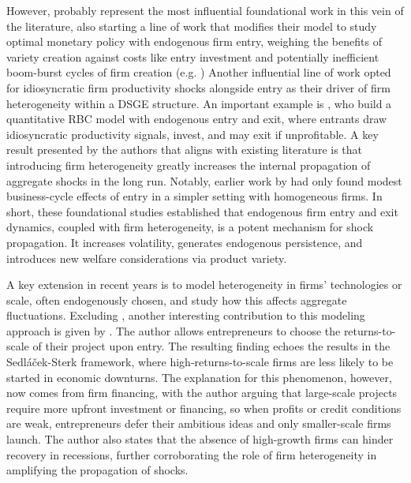 \documentclass[a4paper,12pt]{article} %
\numberwithin{equation}{section} %
\numberwithin{figure}{section}
\numberwithin{table}{section}
\begin{document}
However, \textcite{bilbiie2012endogenous} probably represent the most influential foundational work in this vein of the literature, 
also starting a line of work that modifies their model to study optimal monetary policy with endogenous firm entry, weighing the benefits 
of variety creation against costs like entry investment and potentially inefficient boom-burst cycles of firm creation (e.g. \cite{bilbiie2014optimal, lewis2012firm})
Another influential line of work opted for idiosyncratic firm productivity shocks alongside entry as their driver of firm heterogeneity within a DSGE structure. 
An important example is \textcite{clementi2016entry}, who build a quantitative RBC model with endogenous entry and exit, where entrants draw idiosyncratic 
productivity signals, invest, and may exit if unprofitable. A key result presented by the authors that aligns with existing literature is that introducing 
firm heterogeneity greatly increases the internal propagation of aggregate shocks in the long run. Notably, earlier work by \textcite{samaniego2008entry} had 
only found modest business-cycle effects of entry in a simpler setting with homogeneous firms. In short, these foundational studies established that 
endogenous firm entry and exit dynamics, coupled with firm heterogeneity, is a potent mechanism for shock propagation. It increases volatility, 
generates endogenous persistence, and introduces new welfare considerations via product variety.

A key extension in recent years is to model heterogeneity in firms' technologies or scale, often endogenously chosen, and study how this 
affects aggregate fluctuations. Excluding \textcite{sedlavcek2017growth}, another interesting contribution to this modeling approach is given 
by \textcite{smirnyagin2023returns}. The author allows entrepreneurs to choose the returns-to-scale of their project upon entry. The resulting 
finding echoes the results in the Sedláček-Sterk framework, where high-returns-to-scale firms are less likely to be started in economic downturns.
The explanation for this phenomenon, however, now comes from firm financing, with the author arguing that large-scale projects require more 
upfront investment or financing, so when profits or credit conditions are weak, entrepreneurs defer their ambitious ideas and only smaller-scale 
firms launch. The author also states that the absence of high-growth firms can hinder recovery in recessions, further corroborating the role of 
firm heterogeneity in amplifying the propagation of shocks.
\end{document}
